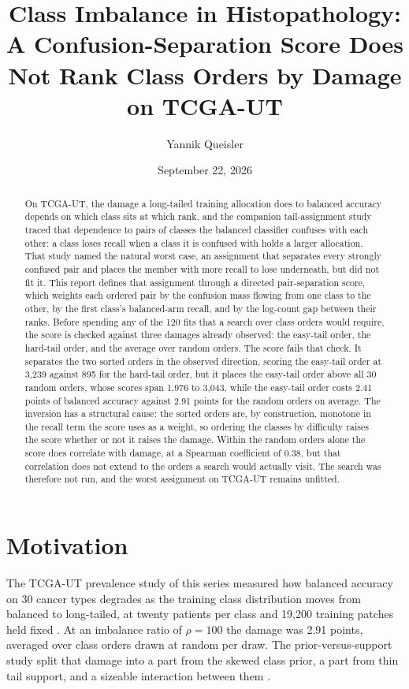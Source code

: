 \documentclass[11pt]{article}
\title{Class Imbalance in Histopathology:\\A Confusion-Separation Score Does Not Rank Class Orders by Damage on TCGA-UT}
\author{Yannik Queisler}
\date{September 22, 2026}
\begin{document}
\raggedbottom
{}
\setlength{\emergencystretch}{2em}
\maketitle
\begin{abstract}
\noindent On TCGA-UT, the damage a long-tailed training allocation does to balanced accuracy depends on which class sits at which rank, and the companion tail-assignment study traced that dependence to pairs of classes the balanced classifier confuses with each other: a class loses recall when a class it is confused with holds a larger allocation. That study named the natural worst case, an assignment that separates every strongly confused pair and places the member with more recall to lose underneath, but did not fit it. This report defines that assignment through a directed pair-separation score, which weights each ordered pair by the confusion mass flowing from one class to the other, by the first class's balanced-arm recall, and by the log-count gap between their ranks. Before spending any of the 120 fits that a search over class orders would require, the score is checked against three damages already observed: the easy-tail order, the hard-tail order, and the average over random orders. The score fails that check. It separates the two sorted orders in the observed direction, scoring the easy-tail order at 3,239 against 895 for the hard-tail order, but it places the easy-tail order above all 30 random orders, whose scores span 1,976 to 3,043, while the easy-tail order costs 2.41 points of balanced accuracy against 2.91 points for the random orders on average. The inversion has a structural cause: the sorted orders are, by construction, monotone in the recall term the score uses as a weight, so ordering the classes by difficulty raises the score whether or not it raises the damage. Within the random orders alone the score does correlate with damage, at a Spearman coefficient of 0.38, but that correlation does not extend to the orders a search would actually visit. The search was therefore not run, and the worst assignment on TCGA-UT remains unfitted.
\end{abstract}

\section{Motivation}
\label{sec:motivation}
The TCGA-UT prevalence study of this series measured how balanced accuracy on 30 cancer types degrades as the training class distribution moves from balanced to long-tailed, at twenty patients per class and 19,200 training patches held fixed \citep{queisler2026prevalenceTcga}. At an imbalance ratio of $\rho=100$ the damage was 2.91 points, averaged over class orders drawn at random per draw. The prior-versus-support study split that damage into a part from the skewed class prior, a part from thin tail support, and a sizeable interaction between them \citep{queisler2026causeTcga}.
\end{document}
